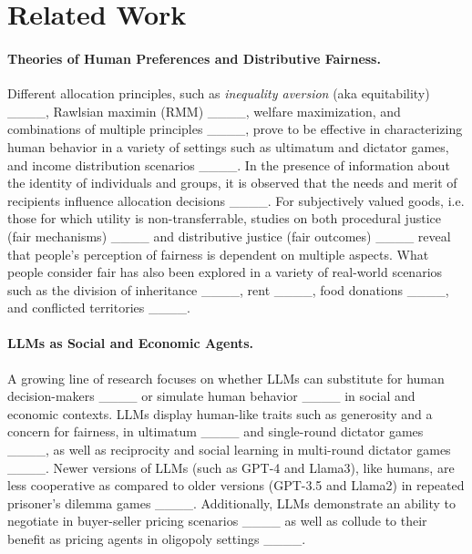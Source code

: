 \section{Related Work}
\paragraph{Theories of Human Preferences and Distributive Fairness.}
Different allocation principles, such as \textit{inequality aversion} (aka equitability) ____, Rawlsian maximin (RMM) ____, welfare maximization, and combinations of multiple principles ____, prove to be effective in characterizing human behavior in a variety of settings such as ultimatum and dictator games, and income distribution scenarios ____. In the presence of information about the identity of individuals and groups, it is observed that the needs and merit of recipients influence allocation decisions ____. For subjectively valued goods, i.e. those for which utility is non-transferrable, studies on both procedural justice (fair mechanisms) ____ and distributive justice (fair outcomes) ____ reveal that people's perception of fairness is dependent on multiple aspects. What people consider fair has also been explored in a variety of real-world scenarios such as the division of inheritance ____, rent ____, food donations ____, and conflicted territories ____. 

\paragraph{LLMs as Social and Economic Agents.}
A growing line of research focuses on whether LLMs can substitute for human decision-makers ____ or simulate human behavior ____ in social and economic contexts. LLMs display human-like traits such as generosity and a concern for fairness, in ultimatum ____ and single-round dictator games ____, as well as reciprocity and social learning in multi-round dictator games ____. 
Newer versions of LLMs (such as GPT-4 and Llama3), like humans, are less cooperative as compared to older versions (GPT-3.5 and Llama2) in repeated prisoner's dilemma games ____. Additionally, LLMs demonstrate an ability to negotiate in buyer-seller pricing scenarios ____ as well as collude to their benefit as pricing agents in oligopoly settings ____. 

